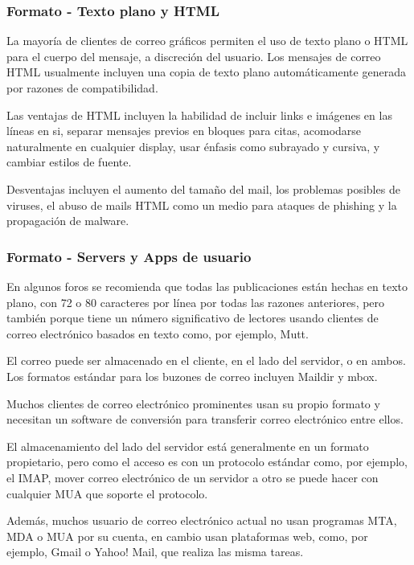 \documentclass{beamer}
\begin{document}
\begin{frame}
\frametitle{Formato - Texto plano y HTML}
\tableofcontents
\small La mayoría de clientes de correo gráficos permiten el uso de texto plano o HTML para el cuerpo del mensaje, a discreción del usuario. Los mensajes de correo HTML usualmente incluyen una copia de texto plano automáticamente generada por razones de compatibilidad. 

Las ventajas de HTML incluyen la habilidad de incluir links e imágenes en las líneas en si, separar mensajes previos en bloques para citas, acomodarse naturalmente en cualquier display, usar énfasis como subrayado y cursiva, y cambiar estilos de fuente. 

Desventajas incluyen el aumento del tamaño del mail, los problemas posibles de viruses, el abuso de mails HTML como un medio para ataques de phishing y la propagación de malware.
\end{frame}

\begin{frame}
\frametitle{Formato - Servers y Apps de usuario}
\tableofcontents
\begin{alertblock}
\footnotesize En algunos foros se recomienda que todas las publicaciones están hechas en texto plano, con 72 o 80 caracteres por línea por todas las razones anteriores, pero también porque tiene un número significativo de lectores usando clientes de correo electrónico basados en texto como, por ejemplo,  Mutt.
\end{alertblock}
\small El correo puede ser almacenado en el cliente, en el lado del servidor, o en ambos. Los formatos estándar para los buzones de correo incluyen Maildir y mbox.

\small Muchos clientes de correo electrónico prominentes usan su propio formato y necesitan un software de conversión para transferir correo electrónico entre ellos.

\small El almacenamiento del lado del servidor está generalmente en un formato propietario, pero como el acceso es con un protocolo estándar como, por ejemplo, el IMAP, mover correo electrónico de un servidor a otro se puede hacer con cualquier MUA que soporte el protocolo.

\small Además, muchos usuario de correo electrónico actual no usan programas MTA, MDA o MUA por su cuenta, en cambio usan plataformas web, como, por ejemplo, Gmail o Yahoo! Mail, que realiza las misma tareas. 
\end{frame}
\end{document}
